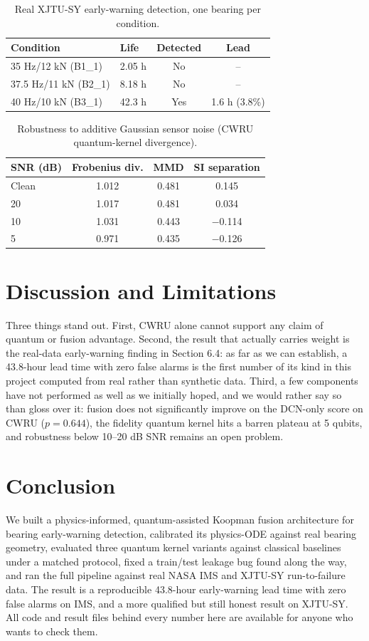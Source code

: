 \documentclass[3p,times,procedia]{elsarticle}
\begin{document}
\begin{table}[ht]
\caption{Real XJTU-SY early-warning detection, one bearing per condition.}
\centering
\begin{tabular}{llcc}
\toprule
\textbf{Condition} & \textbf{Life} & \textbf{Detected} & \textbf{Lead} \\
\midrule
35 Hz/12 kN (B1\_1) & 2.05 h & No & -- \\
37.5 Hz/11 kN (B2\_1) & 8.18 h & No & -- \\
40 Hz/10 kN (B3\_1) & 42.3 h & Yes & 1.6 h (3.8\%) \\
\bottomrule
\end{tabular}
\end{table}

\begin{table}[ht]
\caption{Robustness to additive Gaussian sensor noise (CWRU quantum-kernel divergence).}
\centering
\begin{tabular}{lccc}
\toprule
\textbf{SNR (dB)} & \textbf{Frobenius div.} & \textbf{MMD} & \textbf{SI separation} \\
\midrule
Clean & 1.012 & 0.481 & 0.145 \\
20 & 1.017 & 0.481 & 0.034 \\
10 & 1.031 & 0.443 & $-$0.114 \\
5 & 0.971 & 0.435 & $-$0.126 \\
\bottomrule
\end{tabular}
\end{table}

\section{Discussion and Limitations}
Three things stand out. First, CWRU alone cannot support any claim of quantum or fusion advantage. Second, the result that actually carries weight is the real-data early-warning finding in Section 6.4: as far as we can establish, a 43.8-hour lead time with zero false alarms is the first number of its kind in this project computed from real rather than synthetic data. Third, a few components have not performed as well as we initially hoped, and we would rather say so than gloss over it: fusion does not significantly improve on the DCN-only score on CWRU ($p = 0.644$), the fidelity quantum kernel hits a barren plateau at 5 qubits, and robustness below 10--20 dB SNR remains an open problem. 

\section{Conclusion}
We built a physics-informed, quantum-assisted Koopman fusion architecture for bearing early-warning detection, calibrated its physics-ODE against real bearing geometry, evaluated three quantum kernel variants against classical baselines under a matched protocol, fixed a train/test leakage bug found along the way, and ran the full pipeline against real NASA IMS and XJTU-SY run-to-failure data. The result is a reproducible 43.8-hour early-warning lead time with zero false alarms on IMS, and a more qualified but still honest result on XJTU-SY. All code and result files behind every number here are available for anyone who wants to check them.
\end{document}
